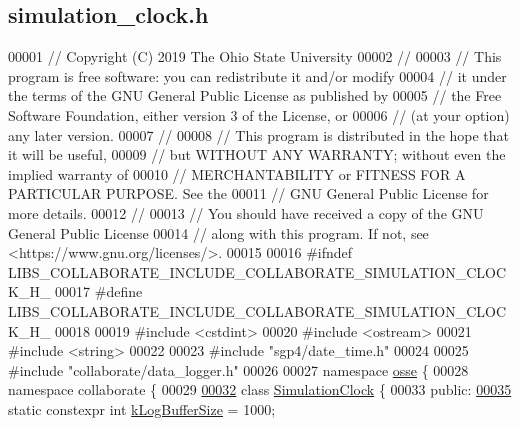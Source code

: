 \hypertarget{simulation__clock_8h_source}{}\subsection{simulation\+\_\+clock.\+h}
\label{simulation__clock_8h_source}

\begin{DoxyCode}
00001 \textcolor{comment}{// Copyright (C) 2019 The Ohio State University}
00002 \textcolor{comment}{//}
00003 \textcolor{comment}{// This program is free software: you can redistribute it and/or modify}
00004 \textcolor{comment}{// it under the terms of the GNU General Public License as published by}
00005 \textcolor{comment}{// the Free Software Foundation, either version 3 of the License, or}
00006 \textcolor{comment}{// (at your option) any later version.}
00007 \textcolor{comment}{//}
00008 \textcolor{comment}{// This program is distributed in the hope that it will be useful,}
00009 \textcolor{comment}{// but WITHOUT ANY WARRANTY; without even the implied warranty of}
00010 \textcolor{comment}{// MERCHANTABILITY or FITNESS FOR A PARTICULAR PURPOSE.  See the}
00011 \textcolor{comment}{// GNU General Public License for more details.}
00012 \textcolor{comment}{//}
00013 \textcolor{comment}{// You should have received a copy of the GNU General Public License}
00014 \textcolor{comment}{// along with this program.  If not, see <https://www.gnu.org/licenses/>.}
00015 
00016 \textcolor{preprocessor}{#ifndef LIBS\_COLLABORATE\_INCLUDE\_COLLABORATE\_SIMULATION\_CLOCK\_H\_}
00017 \textcolor{preprocessor}{#define LIBS\_COLLABORATE\_INCLUDE\_COLLABORATE\_SIMULATION\_CLOCK\_H\_}
00018 
00019 \textcolor{preprocessor}{#include <cstdint>}
00020 \textcolor{preprocessor}{#include <ostream>}
00021 \textcolor{preprocessor}{#include <string>}
00022 
00023 \textcolor{preprocessor}{#include "sgp4/date\_time.h"}
00024 
00025 \textcolor{preprocessor}{#include "collaborate/data\_logger.h"}
00026 
00027 \textcolor{keyword}{namespace }\hyperlink{namespaceosse}{osse} \{
00028 \textcolor{keyword}{namespace }collaborate \{
00029 
\hyperlink{classosse_1_1collaborate_1_1_simulation_clock}{00032} \textcolor{keyword}{class }\hyperlink{classosse_1_1collaborate_1_1_simulation_clock}{SimulationClock} \{
00033  \textcolor{keyword}{public}:
\hyperlink{classosse_1_1collaborate_1_1_simulation_clock_a026eab97f275ec2d672f40b0b0bb7a3d}{00035}   \textcolor{keyword}{static} constexpr \textcolor{keywordtype}{int} \hyperlink{classosse_1_1collaborate_1_1_simulation_clock_a026eab97f275ec2d672f40b0b0bb7a3d}{kLogBufferSize} = 1000;

\end{DoxyCode}

